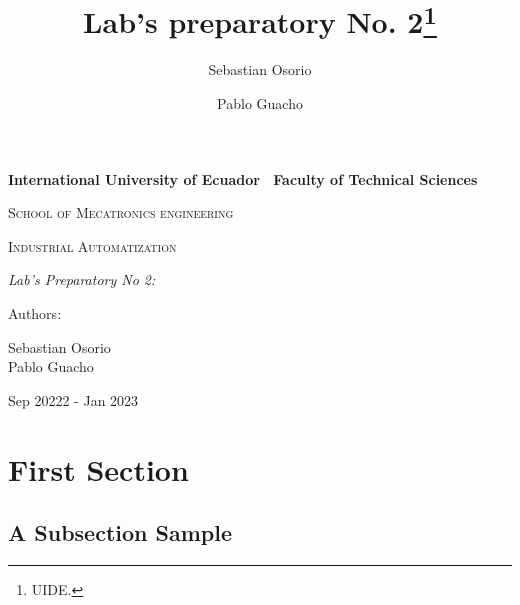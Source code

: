 \documentclass[runningheads]{llncs}
\begin{document}
\begin{titlepage}
\centering
{\bfseries\LARGE International University of Ecuador \ 
Faculty of Technical Sciences  \par}
\vspace{1cm}
{\scshape\Large School of Mecatronics engineering \par}
\vspace{3cm}
{\scshape\Huge Industrial Automatization \par}
\vspace{3cm}
{\itshape\Large Lab's Preparatory No 2:  \par}
\vfill
{\Large Authors: \par}
{\Large Sebastian Osorio \\ Pablo Guacho \par}
\vfill
{\Large Sep 20222 - Jan 2023 \par}
\end{titlepage}
\newpage
\title{Lab's preparatory No. 2\thanks{UIDE.}}
%
\author{Sebastian Osorio \and Pablo Guacho}



\maketitle

\section{First Section}
\subsection{A Subsection Sample}

% 
% 
\end{document}
